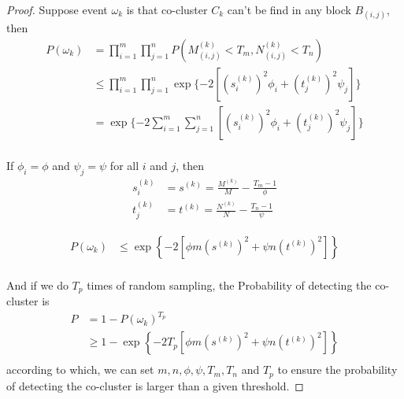 \documentclass[letterpaper, 10 pt, conference]{ieeeconf}  %
\begin{document}
\begin{proof}
    Suppose event $\omega_k$ is that co-cluster $C_k$ can't be find in any block $B_{(i,j)}$, then
    \begin{equation}
        \begin{split}
            P(\omega_k) & = \prod_{i=1}^m \prod_{j=1}^n P(M_{(i,j)}^{(k)} < T_m, N_{(i,j)}^{(k)} < T_n)                          \\
                        & \le \prod_{i=1}^m \prod_{j=1}^n \exp\{-2 \left[ (s_i^{(k)})^2 \phi_i + (t_j^{(k)})^2 \psi_j \right] \} \\
                        & = \exp\{-2 \sum_{i=1}^m \sum_{j=1}^n \left[ (s_i^{(k)})^2 \phi_i + (t_j^{(k)})^2 \psi_j \right] \}     \\
        \end{split}
    \end{equation}

    If $\phi_i = \phi$ and $\psi_j = \psi$ for all $i$ and $j$, then
    \begin{equation}
        \begin{split}
            s_i^{(k)} & = s^{(k)} = \frac{M^{(k)}}{M}-\frac{T_m-1}{\phi} \\
            t_j^{(k)} & = t^{(k)} = \frac{N^{(k)}}{N}-\frac{T_n-1}{\psi}
        \end{split}
    \end{equation}

    \begin{equation}
        \begin{split}
            P(\omega_k) & \le \exp \left\{ -2 [\phi m (s^{(k)})^2 + \psi n (t^{(k)})^2] \right\} \\
        \end{split}
    \end{equation}


    And if we do $T_p$ times of random sampling, the Probability of detecting the co-cluster is
    \begin{equation}
        \begin{split}
            P & = 1 - P(\omega_k)^{T_p}                                                        \\
              & \ge 1 - \exp \left\{ -2 T_p [\phi m (s^{(k)})^2 + \psi n (t^{(k)})^2] \right\} \\
        \end{split}
    \end{equation}
    according to which, we can set $m, n, \phi, \psi, T_m, T_n$ and $T_p$ to ensure the probability of detecting the co-cluster is larger than a given threshold.
\end{proof}
\end{document}
